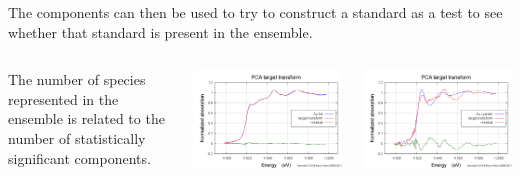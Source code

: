 \documentclass[10pt, xcolor=x11names, compress]{beamer}
\begin{document}
\begin{frame}
\begin{columns}[T]
\begin{column}{0.33\linewidth}
    \end{column}
  \end{columns}

  \medskip

  The components can then be used to try to construct a standard as a
  test to see whether that standard is present in the ensemble.

  \medskip

  \begin{columns}
    \begin{column}{0.33\linewidth}
      The number of species represented in the ensemble is related to
      the number of statistically significant components.
    \end{column}
    \begin{column}{0.33\linewidth}
      \includegraphics[width=\linewidth]{images/pca_tt_in.png}
    \end{column}
    \begin{column}{0.33\linewidth}
      \includegraphics[width=\linewidth]{images/pca_tt_out.png}

\end{column}
\end{columns}
\end{frame}
\end{document}
